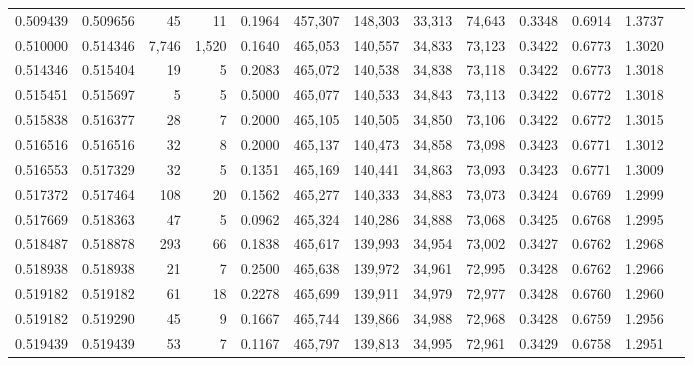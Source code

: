 \begin{tabular}{rrrrrrrrrrrrr}
0.509439 & 0.509656 &     45 &    11 &                                     0.1964 & 457,307 & 148,303 &  33,313 &  74,643 & 0.3348 & 0.6914 & 1.3737 \\
0.510000 & 0.514346 &  7,746 & 1,520 &                                     0.1640 & 465,053 & 140,557 &  34,833 &  73,123 & 0.3422 & 0.6773 & 1.3020 \\
0.514346 & 0.515404 &     19 &     5 &                                     0.2083 & 465,072 & 140,538 &  34,838 &  73,118 & 0.3422 & 0.6773 & 1.3018 \\
0.515451 & 0.515697 &      5 &     5 &                                     0.5000 & 465,077 & 140,533 &  34,843 &  73,113 & 0.3422 & 0.6772 & 1.3018 \\
0.515838 & 0.516377 &     28 &     7 &                                     0.2000 & 465,105 & 140,505 &  34,850 &  73,106 & 0.3422 & 0.6772 & 1.3015 \\
0.516516 & 0.516516 &     32 &     8 &                                     0.2000 & 465,137 & 140,473 &  34,858 &  73,098 & 0.3423 & 0.6771 & 1.3012 \\
0.516553 & 0.517329 &     32 &     5 &                                     0.1351 & 465,169 & 140,441 &  34,863 &  73,093 & 0.3423 & 0.6771 & 1.3009 \\
0.517372 & 0.517464 &    108 &    20 &                                     0.1562 & 465,277 & 140,333 &  34,883 &  73,073 & 0.3424 & 0.6769 & 1.2999 \\
0.517669 & 0.518363 &     47 &     5 &                                     0.0962 & 465,324 & 140,286 &  34,888 &  73,068 & 0.3425 & 0.6768 & 1.2995 \\
0.518487 & 0.518878 &    293 &    66 &                                     0.1838 & 465,617 & 139,993 &  34,954 &  73,002 & 0.3427 & 0.6762 & 1.2968 \\
0.518938 & 0.518938 &     21 &     7 &                                     0.2500 & 465,638 & 139,972 &  34,961 &  72,995 & 0.3428 & 0.6762 & 1.2966 \\
0.519182 & 0.519182 &     61 &    18 &                                     0.2278 & 465,699 & 139,911 &  34,979 &  72,977 & 0.3428 & 0.6760 & 1.2960 \\
0.519182 & 0.519290 &     45 &     9 &                                     0.1667 & 465,744 & 139,866 &  34,988 &  72,968 & 0.3428 & 0.6759 & 1.2956 \\
0.519439 & 0.519439 &     53 &     7 &                                     0.1167 & 465,797 & 139,813 &  34,995 &  72,961 & 0.3429 & 0.6758 & 1.2951 \\

\end{tabular}
